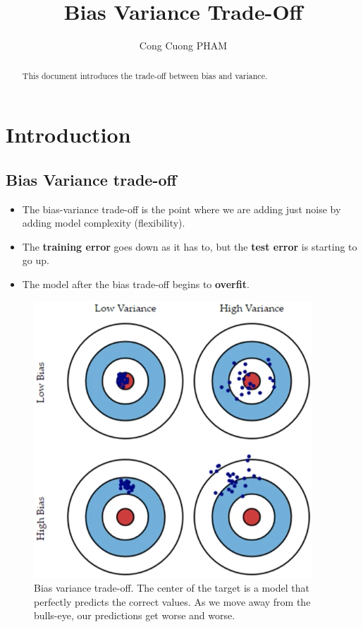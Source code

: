 \documentclass{article}
\begin{document}
\title{Bias Variance Trade-Off}
\author{Cong Cuong PHAM}

\maketitle

\begin{abstract}
This document introduces the trade-off between bias and variance.
\end{abstract}

\section{Introduction}
\subsection{Bias Variance trade-off}
\begin{itemize}
	\item The bias-variance trade-off is the point where we are adding just noise by adding model complexity (flexibility).
	\item The {\bf{training error}} goes down as it has to, but the {\bf{test error}} is starting to go up.
	\item The model after the bias trade-off begins to {\bf{overfit}}.
\end{itemize}

\begin{figure}[H]
\centering
\includegraphics[width=0.6\linewidth]{pic/bias-variance-trade_off.png}
\caption{Bias variance trade-off. The center of the target is a model that perfectly predicts the correct values. As we move away from the bulls-eye, our predictions get worse and worse.}
\end{figure}
\end{document}
